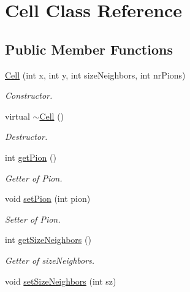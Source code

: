 \hypertarget{classCell}{\section{Cell Class Reference}
\label{classCell}
}
\subsection*{Public Member Functions}
\begin{DoxyCompactItemize}
\item 
\hyperlink{classCell_af291f5d49a4d134d16cdcb1f3a677572}{Cell} (int x, int y, int size\+Neighbors, int nr\+Pions)
\begin{DoxyCompactList}\small\item\em Constructor. \end{DoxyCompactList}\item 
\hypertarget{classCell_a9fa559f7a28e2b4336c6879ca09304d8}{virtual \hyperlink{classCell_a9fa559f7a28e2b4336c6879ca09304d8}{$\sim$\+Cell} ()}\label{classCell_a9fa559f7a28e2b4336c6879ca09304d8}

\begin{DoxyCompactList}\small\item\em Destructor. \end{DoxyCompactList}\item 
int \hyperlink{classCell_ac5aaa7dc8c6be76f373a06999451d625}{get\+Pion} ()
\begin{DoxyCompactList}\small\item\em Getter of Pion. \end{DoxyCompactList}\item 
\hypertarget{classCell_ae3f17f569258bea1dd3643244f52149e}{void \hyperlink{classCell_ae3f17f569258bea1dd3643244f52149e}{set\+Pion} (int pion)}\label{classCell_ae3f17f569258bea1dd3643244f52149e}

\begin{DoxyCompactList}\small\item\em Setter of Pion. \end{DoxyCompactList}\item 
int \hyperlink{classCell_a836edee87a5946b09be6aaab10a965c7}{get\+Size\+Neighbors} ()
\begin{DoxyCompactList}\small\item\em Getter of size\+Neighbors. \end{DoxyCompactList}\item 
\hypertarget{classCell_a3a77c433964c5d5273a1612efa4a328a}{void \hyperlink{classCell_a3a77c433964c5d5273a1612efa4a328a}{set\+Size\+Neighbors} (int sz)}\label{classCell_a3a77c433964c5d5273a1612efa4a328a}


\end{DoxyCompactItemize}
